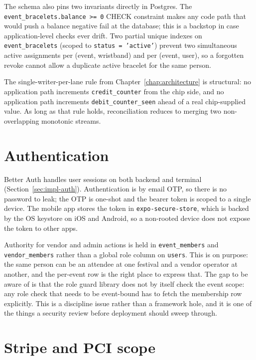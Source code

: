 The schema also pins two invariants directly in Postgres. The \texttt{event\_bracelets.balance >= 0} CHECK constraint makes any code path that would push a balance negative fail at the database; this is a backstop in case application-level checks ever drift. Two partial unique indexes on \texttt{event\_bracelets} (scoped to \texttt{status = 'active'}) prevent two simultaneous active assignments per (event, wristband) and per (event, user), so a forgotten revoke cannot allow a duplicate active bracelet for the same person.

The single-writer-per-lane rule from Chapter~\ref{chap:architecture} is structural: no application path increments \texttt{credit\_counter} from the chip side, and no application path increments \texttt{debit\_counter\_seen} ahead of a real chip-supplied value. As long as that rule holds, reconciliation reduces to merging two non-overlapping monotonic streams.

\section{Authentication}
\label{sec:auth-security}

Better Auth handles user sessions on both backend and terminal (Section~\ref{sec:impl-auth}). Authentication is by email OTP, so there is no password to leak; the OTP is one-shot and the bearer token is scoped to a single device. The mobile app stores the token in \texttt{expo-secure-store}, which is backed by the OS keystore on iOS and Android, so a non-rooted device does not expose the token to other apps.

Authority for vendor and admin actions is held in \texttt{event\_members} and \texttt{vendor\_members} rather than a global role column on \texttt{users}. This is on purpose: the same person can be an attendee at one festival and a vendor operator at another, and the per-event row is the right place to express that. The gap to be aware of is that the role guard library does not by itself check the event scope: any role check that needs to be event-bound has to fetch the membership row explicitly. This is a discipline issue rather than a framework hole, and it is one of the things a security review before deployment should sweep through.

\section{Stripe and PCI scope}
\label{sec:stripe-security}

